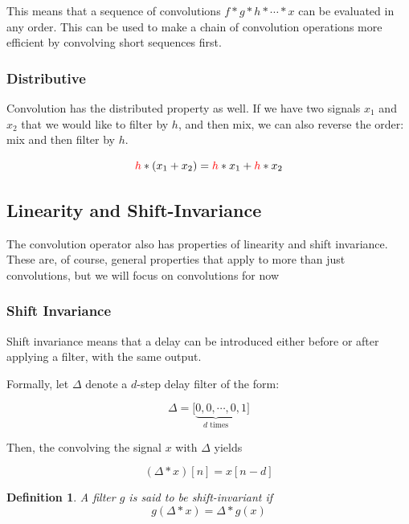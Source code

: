 \documentclass{article}
\newtheorem{definition}{Definition}
\begin{document}
This means that a sequence of convolutions $f * g * h * \cdots * x$ can be
evaluated in any order. This can be used to make a chain of convolution operations
more efficient by convolving short sequences first.

\subsubsection{Distributive}

Convolution has the distributed property as well. If we have two signals $x_1$
and $x_2$ that we would like to filter by $h$, and then mix, we can also reverse
the order: mix and then filter by $h$.

\begin{equation}
    \textcolor{red}{h} * (x_1 + x_2) = \textcolor{red}{h} * x_1 +
        \textcolor{red}{h} * x_2
\end{equation}

\subsection{Linearity and Shift-Invariance}

The convolution operator also has properties of linearity and shift invariance.
These are, of course, general properties that apply to more than just convolutions,
but we will focus on convolutions for now

\subsubsection{Shift Invariance}

Shift invariance means that a delay can be introduced either before or after
applying a filter, with the same output. 

Formally, let $\Delta$ denote a $d$-step delay filter of the form:

\begin{equation}
    \Delta = \bigl[
        \underbrace{
            0, 0, \cdots, 0
        }_{\text{$d$ times}}, 1
    \bigr]
\end{equation}

Then, the convolving the signal $x$ with $\Delta$ yields

\begin{equation}
    (\Delta * x)[n] = x[n - d]
\end{equation}

\begin{definition}
    A filter $g$ is said to be shift-invariant if
    \begin{equation}
        g(\Delta * x) = \Delta * g(x)
    \end{equation}
\end{definition}
\end{document}
